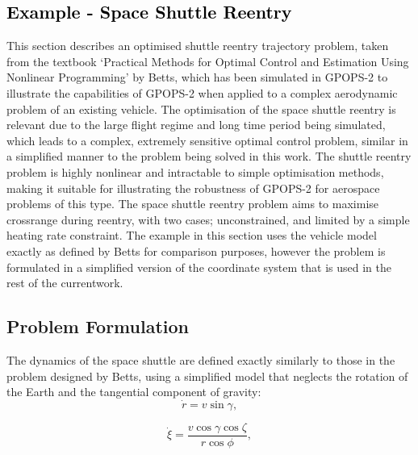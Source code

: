 \textcolor{black}{\section{Example - Space Shuttle Reentry}}
\noindent
This section describes an optimised shuttle reentry trajectory problem, taken from the textbook `Practical Methods for Optimal Control and Estimation Using Nonlinear Programming' by Betts\cite{Betts2009}, which has been simulated in GPOPS-2 to illustrate the capabilities of GPOPS-2 when applied to a complex aerodynamic problem of an existing vehicle. The optimisation of the space shuttle reentry is relevant due to the large flight regime and long time period being simulated, which leads to a complex, extremely sensitive optimal control problem\cite{Betts2009}, similar in a simplified manner to the problem being solved in this work. The shuttle reentry problem is highly nonlinear and intractable to simple optimisation methods\cite{Betts2009}, making it suitable for illustrating the robustness of GPOPS-2 for aerospace problems of this type. 
The space shuttle reentry problem aims to maximise crossrange during reentry, with two cases; unconstrained, and limited by a simple heating rate constraint. The example in this section uses the vehicle model exactly as defined by Betts\cite{Betts2009} for comparison purposes, however the problem is formulated in a simplified version of the coordinate system that is used in the rest of the currentwork. 


\subsection{Problem Formulation}

The dynamics of the space shuttle are defined exactly similarly to those in the problem designed by Betts\cite{Betts2009}, using a simplified model that neglects the rotation of the Earth and the tangential component of gravity:
\begin{equation}
\dot{r} = v \sin \gamma,
\end{equation}

\begin{equation}
\dot{\xi} = \frac{v\cos \gamma \cos \zeta}{r \cos \phi},
\end{equation}


